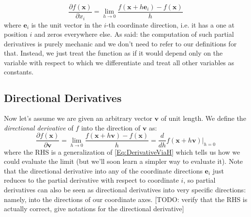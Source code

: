 \begin{equation}
 \frac{\partial f(\mathbf{x}) }{\partial x_i} 
 = \lim_{h \rightarrow 0} \frac{f(\mathbf{x} + h \mathbf{e}_i ) - f(\mathbf{x})}{h}
\end{equation}
where $\mathbf{e}_i$ is the unit vector in the $i$-th coordinate direction, i.e. it has a one at position $i$ and zeros everywhere else. As said: the computation of such partial derivatives is purely mechanic and we don't need to refer to our definitions for that. Instead, we just treat the function as if it would depend only on the variable with respect to which we differentiate and treat all other variables as constants.

\subsection{Directional Derivatives}
Now let's assume we are given an arbitrary vector $\mathbf{v}$ of unit length. We define the \emph{directional derivative} of $f$ into the direction of  $\mathbf{v}$ as:
\begin{equation}
\label{Eq:DirectionalDerivative}
 \frac{\partial f(\mathbf{x}) }{\partial \mathbf{v}} 
 = \lim_{h \rightarrow 0} \frac{f(\mathbf{x} + h \mathbf{v} ) - f(\mathbf{x})}{h}
 = \frac{d}{d h} f(\mathbf{x} + h \mathbf{v}) \bigg\rvert_{h=0}
\end{equation}
where the RHS is a generalization of \ref{Eq:DerivativeViaH} which tells us how we could evaluate the limit (but we'll soon learn a simpler way to evaluate it). Note that the directional derivative into any of the coordinate directions $\mathbf{e}_i$ just reduces to the partial derivative with respect to coordinate $i$, so partial derivatives can also be seen as directional derivatives into very specific directions: namely, into the directions of our coordinate axes. [TODO: verify that the RHS is actually correct, give notations for the directional derivative] 



